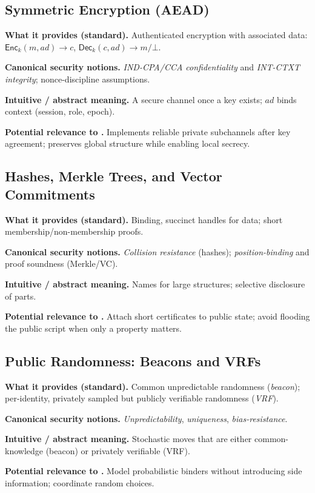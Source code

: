 \subsection{Symmetric Encryption (AEAD)}
\textbf{What it provides (standard).}
Authenticated encryption with associated data: $\mathsf{Enc}_k(m,ad)\to c$,
$\mathsf{Dec}_k(c,ad)\to m/\bot$.

\textbf{Canonical security notions.}
\emph{IND-CPA/CCA confidentiality} and \emph{INT-CTXT integrity}; nonce-discipline assumptions.

\textbf{Intuitive / abstract meaning.}
A secure channel once a key exists; $ad$ binds context (session, role, epoch).

\textbf{Potential relevance to \KFOL.}
Implements reliable private subchannels after key agreement; preserves global
structure while enabling local secrecy.

\subsection{Hashes, Merkle Trees, and Vector Commitments}
\textbf{What it provides (standard).}
Binding, succinct handles for data; short membership/non-membership proofs.

\textbf{Canonical security notions.}
\emph{Collision resistance} (hashes); \emph{position-binding} and proof soundness (Merkle/VC).

\textbf{Intuitive / abstract meaning.}
Names for large structures; selective disclosure of parts.

\textbf{Potential relevance to \KFOL.}
Attach short certificates to public state; avoid flooding the public script when
only a property matters.

\subsection{Public Randomness: Beacons and VRFs}
\textbf{What it provides (standard).}
Common unpredictable randomness (\emph{beacon}); per-identity, privately sampled
but publicly verifiable randomness (\emph{VRF}).

\textbf{Canonical security notions.}
\emph{Unpredictability}, \emph{uniqueness}, \emph{bias-resistance}.

\textbf{Intuitive / abstract meaning.}
Stochastic moves that are either common-knowledge (beacon) or privately verifiable (VRF).

\textbf{Potential relevance to \KFOL.}
Model probabilistic binders without introducing side information; coordinate
random choices.

